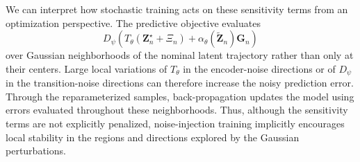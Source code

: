 \documentclass[11pt]{article}
\begin{document}
We can interpret how stochastic training acts on these sensitivity terms from an optimization perspective. The predictive objective evaluates
\[
    D_\psi\left(
        T_\theta(\mathbf Z_n^\star+\Xi_n)
        +
        \alpha_\theta(\widetilde{\mathbf Z}_n)\mathbf G_n
    \right)
\]
over Gaussian neighborhoods of the nominal latent trajectory rather than only at their centers. Large local variations of $T_\theta$ in the encoder-noise directions or of $D_\psi$ in the transition-noise directions can therefore increase the noisy prediction error. Through the reparameterized samples, back-propagation updates the model using errors evaluated throughout these neighborhoods. Thus, although the sensitivity terms are not explicitly penalized, noise-injection training implicitly encourages local stability in the regions and directions explored by the Gaussian perturbations.

\iffalse
\end{document}
